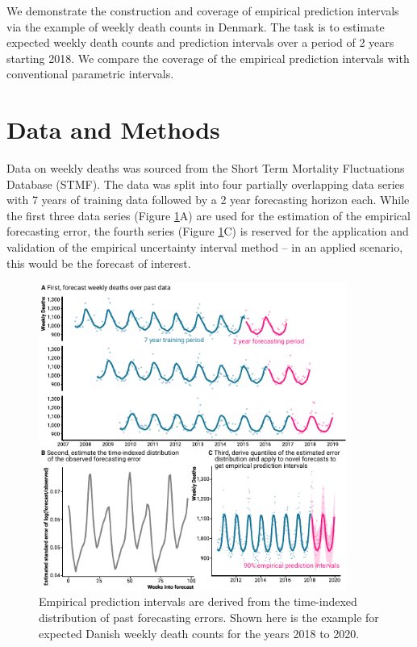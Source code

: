 \documentclass[12pt]{article}
\begin{document}
We demonstrate the construction and coverage of empirical prediction intervals via the example of weekly death counts in Denmark. The task is to estimate expected weekly death counts and prediction intervals over a period of 2 years starting 2018. We compare the coverage of the empirical prediction intervals with conventional parametric intervals.

\section*{Data and Methods}

Data on weekly deaths was sourced from the Short Term Mortality Fluctuations Database (STMF)\cite{Jdanov2021a}. The data was split into four partially overlapping data series with 7 years of training data followed by a 2 year forecasting horizon each. While the first three data series (Figure \ref{fig:figure-1}A) are used for the estimation of the empirical forecasting error, the fourth series (Figure \ref{fig:figure-1}C) is reserved for the application and validation of the empirical uncertainty interval method -- in an applied scenario, this would be the forecast of interest.

\begin{figure}[ht!]
    \centering
    \includegraphics[width=0.9\textwidth]{figure_1.pdf}
     \caption{Empirical prediction intervals are derived from the time-indexed distribution of past forecasting errors. Shown here is the example for expected Danish weekly death counts for the years 2018 to 2020.}
     \label{fig:figure-1}
\end{figure}
\end{document}

